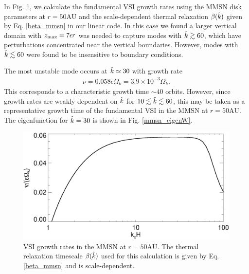 In Fig. \ref{mmsn_growth}, we calculate the fundamental
VSI growth rates using the MMSN disk parameters at $r=50\mathrm{AU}$
and the scale-dependent thermal relaxation $\beta(\hat{k})$ given by
Eq. \ref{beta_mmsn} in our linear code.  In this case we found a 
larger vertical domain with $z_\mathrm{max}=7\epsilon r$ was needed to capture
modes with $\hat{k}\gtrsim60$, which have perturbations
concentrated near the vertical boundaries. However, modes with
$\hat{k}\lesssim 60$ were found to be insensitive to boundary
conditions. 

The most unstable mode occurs at $\hat{k}\simeq30$ with growth rate 
\begin{align*}
  \nu =0.058\epsilon\Omega_k = 3.9\times10^{-3}\Omega_k.  
\end{align*}
This corresponds to a characteristic growth time $\sim
40$ orbits. However, since growth rates are weakly dependent on $\hat{k}$ for
$10\lesssim \hat{k} \lesssim 60$, this may be taken as a representative growth
time of the fundamental VSI in the MMSN at $r=50\mathrm{AU}$. The
eigenfunction for $\hat{k}=30$ is shown in Fig. \ref{mmsn_eigenW}. 

\begin{figure}
  \includegraphics[width=\linewidth,clip=true,trim=0cm 0cm 0cm
  0cm]{figures/growth_mmsn_50AU} 
  \caption{VSI growth rates in the MMSN at
    $r=50\mathrm{AU}$. The thermal relaxation timescale $\beta(\hat{k})$
    used for this calculation is given by
    Eq. \ref{beta_mmsn} and is scale-dependent. 
    \label{mmsn_growth}}  
\end{figure}



